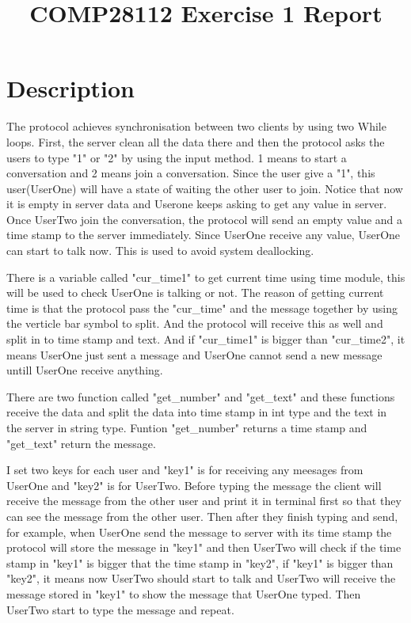 \documentclass[a4]{article}
\title{COMP28112 Exercise 1 Report}
\author{}
\begin{document}
\maketitle

\section{Description}
	
	The protocol achieves synchronisation between two clients by using two While loops. First, the server clean all the data there and then the protocol asks the users to type "1" or "2" by using the input method. 1 means to start a conversation and 2 means join a conversation. Since the user give a "1", this user(UserOne) will have a state of waiting the other user to join. Notice that now it is empty in server data and Userone keeps asking to get any value in server. Once UserTwo join the conversation, the protocol will send an empty value and a time stamp to the server immediately. Since UserOne receive any value, UserOne can start to talk now. This is used to avoid system deallocking. 

	There is a variable called "cur\_time1" to get current time using time module, this will be used to check UserOne is talking or not. 
	The reason of getting current time is that the protocol pass the "cur\_time" and the message together by using the verticle bar symbol to split. And the protocol will receive this as well and split in to time stamp and text. And if "cur\_time1" is bigger than "cur\_time2", it means UserOne just sent a message and UserOne cannot send a new message untill UserOne receive anything.

	There are two function called "get\_number" and "get\_text" and these functions receive the data and split the data into time stamp in int type and the text in the server in string type. Funtion "get\_number" returns a time stamp and "get\_text" return the message.

	I set two keys for each user and "key1" is for receiving any meesages from UserOne and "key2" is for UserTwo. Before typing the message the client will receive the message from the other user and print it in terminal first so that they can see the message from the other user. Then after they finish typing and send, for example, when UserOne send the message to server with its time stamp the protocol will store the message in "key1" and then UserTwo will check if the time stamp in "key1" is bigger that the time stamp in "key2", if "key1" is bigger than "key2", it means now UserTwo should start to talk and UserTwo will receive the message stored in "key1" to show the message that UserOne typed. Then UserTwo start to type the message and repeat.
\end{document}
